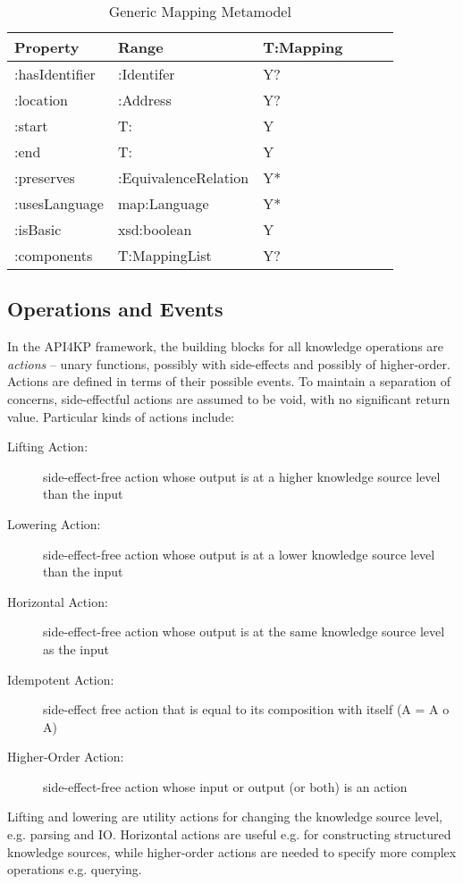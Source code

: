 \documentclass[runningheads]{llncs}
\begin{document}
\begin{table}[h]
\centering
\begin{tabular}{|l|l|l|l|l|l|}
 \hline
\textbf{Property} & \textbf{Range} & \textbf{T:Mapping}   \\ \hline
:hasIdentifier    & :Identifer     &  Y?                       \\ \hline
:location         & :Address       &  Y?                       \\ \hline
:start          & T:               &  Y                       \\ \hline
:end            & T:               &  Y                       \\ \hline
:preserves        & :EquivalenceRelation    &  Y*              \\ \hline
:usesLanguage     & map:Language    &  Y*              \\ \hline
:isBasic         & xsd:boolean     &  Y              \\ \hline
:components      & T:MappingList     &  Y?              \\ \hline
\end{tabular}
\caption{Generic Mapping Metamodel}
\label{krmaponto}
\end{table}


\subsection{Operations and Events}
\label{sec:op}

In the API4KP framework, the building blocks for all knowledge operations are \emph{actions} -- unary functions, possibly with side-effects and possibly of higher-order. Actions are defined in terms of their possible events. To maintain a separation of concerns, side-effectful actions are assumed to be void, with no significant return value. Particular kinds of actions include:

\begin{description}
      \item[Lifting Action:] side-effect-free action whose output is at a higher knowledge source level than the input
      \item[Lowering Action:]  side-effect-free action whose output is at a lower knowledge source level than the input
      \item[Horizontal Action:] side-effect-free action whose output is at the same knowledge source level as the input
      \item[Idempotent Action:] side-effect free action that is equal to its composition with itself (A = A o A)
      \item[Higher-Order Action:] side-effect-free action whose input or output (or both) is an action
\end{description}
Lifting and lowering are utility actions for changing the knowledge source level, e.g. parsing and IO. 
Horizontal actions are useful e.g. for constructing structured knowledge sources, while higher-order actions are needed to specify more complex operations e.g. querying.
\end{document}

